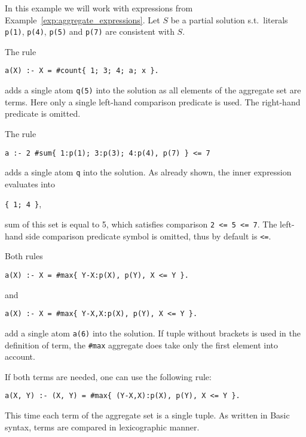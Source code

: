 \begin{example}
    In this example we will work with expressions from Example~\ref{exp:aggregate_expressions}.
    Let $S$ be a partial solution s.t.\ literals \texttt{p(1)}, \texttt{p(4)},
    \texttt{p(5)} and \texttt{p(7)} are consistent with $S$.

    The rule
    \begin{center}
        \texttt{a(X) :- X = \#count\{ 1; 3; 4; a; x \}.}  %
    \end{center}
    adds a single atom \texttt{q(5)} into the solution as all
    elements of the aggregate set are terms.
    Here only a single left-hand comparison predicate is used. The right-hand
    predicate is omitted.

    The rule
    \begin{center}
        \texttt{a :- 2 \#sum\{ 1:p(1); 3:p(3); 4:p(4), p(7) \} <= 7}  %
    \end{center}
    adds a single atom \texttt{q} into the solution.
    As already shown, the inner expression evaluates into
    \begin{center}
        \texttt{\{ 1; 4 \}},  %
    \end{center}
    sum of this set is equal to 5, which satisfies comparison \texttt{2 <= 5 <= 7}.
    The left-hand side comparison predicate symbol is omitted, thus by default is \texttt{<=}.

    Both rules
    \begin{center}
        \texttt{a(X) :- X = \#max\{ Y-X:p(X), p(Y), X <= Y \}.}  %
    \end{center}
    and
    \begin{center}
        \texttt{a(X) :- X = \#max\{ Y-X,X:p(X), p(Y), X <= Y \}.}  %
    \end{center}
    add a single atom \texttt{a(6)} into the solution. If tuple without brackets
    is used in the definition of term, the \texttt{\#max} aggregate does take only
    the first element into account.

    If both terms are needed, one can use the following rule:
    \begin{center}
        \texttt{a(X, Y) :- (X, Y) = \#max\{ (Y-X,X):p(X), p(Y), X <= Y \}.}  %
    \end{center}
    This time each term of the aggregate set is a single tuple.
    As written in Basic syntax, terms are compared in lexicographic manner.
\end{example}

